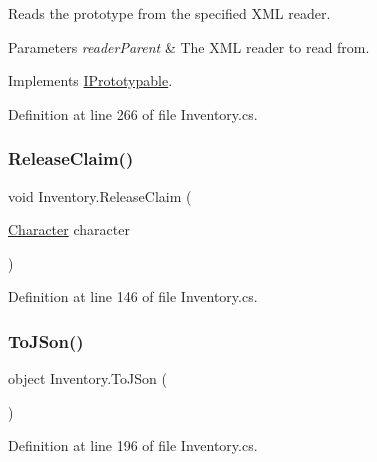 Reads the prototype from the specified X\+ML reader. 


\begin{DoxyParams}{Parameters}
{\em reader\+Parent} & The X\+ML reader to read from.\\
\hline
\end{DoxyParams}


Implements \hyperlink{interface_i_prototypable_a024d752c4be655a7166db5718f1fad6a}{I\+Prototypable}.



Definition at line 266 of file Inventory.\+cs.

\mbox{\label{class_inventory_a3f0c0fdb89b16a036ad6a6f73021a906}} 
\subsubsection{\texorpdfstring{Release\+Claim()}{ReleaseClaim()}}
{\footnotesize\ttfamily void Inventory.\+Release\+Claim (\begin{DoxyParamCaption}\item[{\hyperlink{class_project_porcupine_1_1_entities_1_1_character}{Character}}]{character }\end{DoxyParamCaption})}



Definition at line 146 of file Inventory.\+cs.

\mbox{\label{class_inventory_af242e454f4f434098177fcea0f56214c}} 
\subsubsection{\texorpdfstring{To\+J\+Son()}{ToJSon()}}
{\footnotesize\ttfamily object Inventory.\+To\+J\+Son (\begin{DoxyParamCaption}{ }\end{DoxyParamCaption})}



Definition at line 196 of file Inventory.\+cs.

\mbox{\label{class_inventory_ade6e157a03985e91c6f00881e423d058}} 
